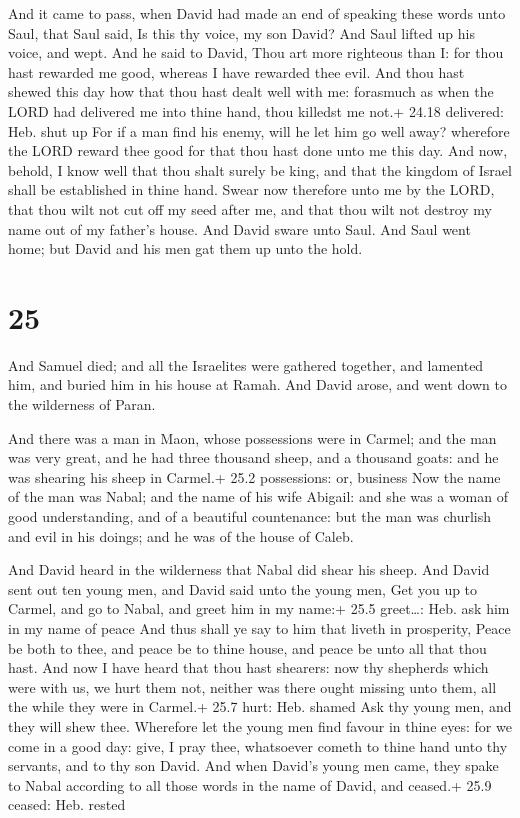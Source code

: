  And it came to pass, when David had made an end of
speaking these words unto Saul, that Saul said, Is this thy voice, my
son David? And Saul lifted up his voice, and wept.  And he
said to David, Thou art more righteous than I: for thou hast rewarded me
good, whereas I have rewarded thee evil.  And thou hast
shewed this day how that thou hast dealt well with me: forasmuch as when
the LORD had delivered me into thine hand, thou killedst me not.+ 24.18
delivered: Heb. shut up  For if a man find his enemy, will
he let him go well away? wherefore the LORD reward thee good for that
thou hast done unto me this day.  And now, behold, I know
well that thou shalt surely be king, and that the kingdom of Israel
shall be established in thine hand.  Swear now therefore
unto me by the LORD, that thou wilt not cut off my seed after me, and
that thou wilt not destroy my name out of my father's house.
 And David sware unto Saul. And Saul went home; but David
and his men gat them up unto the hold.

\hypertarget{section-24}{%
\section{25}\label{section-24}}

 And Samuel died; and all the Israelites were gathered
together, and lamented him, and buried him in his house at Ramah. And
David arose, and went down to the wilderness of Paran.

 And there was a man in Maon, whose possessions were in
Carmel; and the man was very great, and he had three thousand sheep, and
a thousand goats: and he was shearing his sheep in Carmel.+ 25.2
possessions: or, business  Now the name of the man was
Nabal; and the name of his wife Abigail: and she was a woman of good
understanding, and of a beautiful countenance: but the man was churlish
and evil in his doings; and he was of the house of Caleb.

 And David heard in the wilderness that Nabal did shear
his sheep.  And David sent out ten young men, and David said
unto the young men, Get you up to Carmel, and go to Nabal, and greet him
in my name:+ 25.5 greet\ldots: Heb. ask him in my name of peace
 And thus shall ye say to him that liveth in prosperity,
Peace be both to thee, and peace be to thine house, and peace be unto
all that thou hast.  And now I have heard that thou hast
shearers: now thy shepherds which were with us, we hurt them not,
neither was there ought missing unto them, all the while they were in
Carmel.+ 25.7 hurt: Heb. shamed  Ask thy young men, and they
will shew thee. Wherefore let the young men find favour in thine eyes:
for we come in a good day: give, I pray thee, whatsoever cometh to thine
hand unto thy servants, and to thy son David.  And when
David's young men came, they spake to Nabal according to all those words
in the name of David, and ceased.+ 25.9 ceased: Heb. rested

